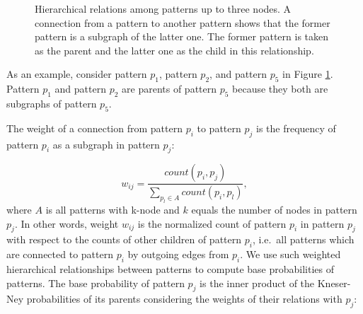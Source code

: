\begin{figure}[!t]
\begin{center}
{
  }
  \end{center}
  \caption{Hierarchical relations among patterns up to three nodes. A connection from a pattern to another pattern shows that the former pattern is a subgraph of the latter one. 
  The former pattern is taken as the parent and the latter one as the child in this relationship.} 
  \label{fig:parent-child-rel}
\end{figure}
%
As an example, consider pattern $p_1$, pattern $p_2$, and pattern $p_5$ in Figure \ref{fig:parent-child-rel}. 
Pattern $p_1$ and pattern $p_2$ are parents of pattern $p_5$ because they both are subgraphs of pattern $p_5$. 

The weight of a connection from pattern $p_i$ to pattern $p_j$ is the frequency of pattern $p_i$ as a subgraph in pattern $p_j$:

\begin{equation}
\label{eq:weights}
w_{ij} = \frac{count(p_i, p_j)}{\sum_{p_l \in A}count(p_i,p_l)},
\end{equation}
%
where $A$ is all patterns with k-node and $k$ equals the number of nodes in pattern $p_j$. 
In other words, weight $w_{ij}$ is the normalized count of pattern $p_i$ in pattern $p_j$ with respect to the counts of  other children of pattern  $p_i$, i.e.\ all patterns which are connected to pattern $p_i$ by outgoing edges from $p_i$.  
We use such weighted hierarchical relationships between patterns to compute base probabilities of patterns. 
The base probability of pattern $p_j$ is the inner product
of the \mbox{Kneser-Ney} probabilities of its parents considering the weights of their relations with $p_j$:


